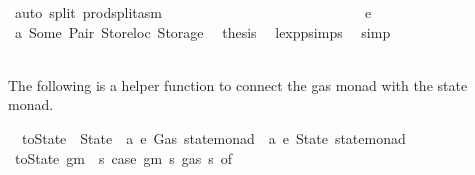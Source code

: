 \begin{isabellebody}
\ {\isacharparenleft}{\kern0pt}auto\ split{\isacharcolon}{\kern0pt}\ prod{\isachardot}{\kern0pt}split{\isacharunderscore}{\kern0pt}asm{\isacharparenright}{\kern0pt}\isanewline
\ \ \ \ \ \ \ \ \ \ \ \ \isamarkupfalse%
\isanewline
\ \ \ \ \ \ \ \ \ \ \ \ \ \ \isamarkupfalse%
\ {\isacharparenleft}{\kern0pt}e\ {\isacharunderscore}{\kern0pt}{\isacharparenright}{\kern0pt}\isanewline
\ \ \ \ \ \ \ \ \ \ \ \ \ \ \isamarkupfalse%
\ a{}\ Some\ Pair\ Storeloc\ Storage\ \isamarkupfalse%
\ {\isacharquery}{\kern0pt}thesis\ \isamarkupfalse%
\ lexp{\isachardot}{\kern0pt}psimps{\isacharparenleft}{\kern0pt}{}{\isacharparenright}{\kern0pt}\ \isamarkupfalse%
\ simp\isanewline
\ \ \ \ \ \ \ \ \ \ \ \ \isamarkupfalse%
\isanewline
\ \ \ \ \ \ \ \ \ \ \isamarkupfalse%
\isanewline
\ \ \ \ \ \ \ \ \isamarkupfalse%
\isanewline
\ \ \ \ \ \ \isamarkupfalse%
\isanewline
\ \ \ \ \isamarkupfalse%
\isanewline
\ \ \isamarkupfalse%
\isanewline
{}\isamarkupfalse%
%
\endisatagproof
{\isafoldproof}%
%
\isadelimproof
%
\endisadelimproof
%
\isadelimdocument
%
\endisadelimdocument
%
\isatagdocument
%
\isamarkuptrue%
%
\endisatagdocument
{\isafolddocument}%
%
\isadelimdocument
%
\endisadelimdocument
%
\begin{isamarkuptext}%
The following is a helper function to connect the gas monad with the state monad.%
\end{isamarkuptext}\isamarkuptrue%
\isamarkupfalse%
\isanewline
\ \ toState\ {\isacharcolon}{\kern0pt}{\isacharcolon}{\kern0pt}\ {\isachardoublequoteopen}{\isacharparenleft}{\kern0pt}State\ {\isasymRightarrow}\ {\isacharparenleft}{\kern0pt}{\isacharprime}{\kern0pt}a{\isacharcomma}{\kern0pt}\ {\isacharprime}{\kern0pt}e{\isacharcomma}{\kern0pt}\ Gas{\isacharparenright}{\kern0pt}\ state{\isacharunderscore}{\kern0pt}monad{\isacharparenright}{\kern0pt}\ {\isasymRightarrow}\ {\isacharparenleft}{\kern0pt}{\isacharprime}{\kern0pt}a{\isacharcomma}{\kern0pt}\ {\isacharprime}{\kern0pt}e{\isacharcomma}{\kern0pt}\ State{\isacharparenright}{\kern0pt}\ state{\isacharunderscore}{\kern0pt}monad{\isachardoublequoteclose}\ \isanewline
\ {\isachardoublequoteopen}toState\ gm\ {\isacharequal}{\kern0pt}\ {\isacharparenleft}{\kern0pt}{\isasymlambda}s{\isachardot}{\kern0pt}\ case\ gm\ s\ {\isacharparenleft}{\kern0pt}gas\ s{\isacharparenright}{\kern0pt}\ of\isanewline

\end{isabellebody}
